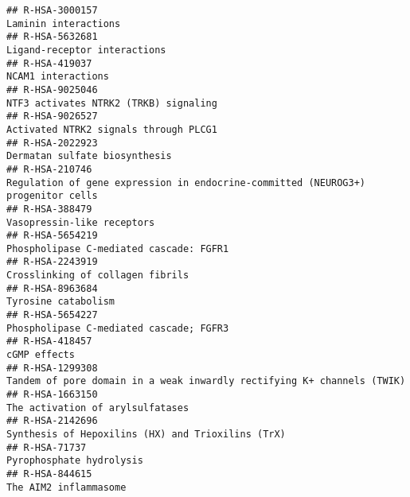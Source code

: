 \documentclass[
]{article}
\begin{document}
\begin{verbatim}
## R-HSA-3000157                                                                                                                 Laminin interactions
## R-HSA-5632681                                                                                                         Ligand-receptor interactions
## R-HSA-419037                                                                                                                    NCAM1 interactions
## R-HSA-9025046                                                                                                NTF3 activates NTRK2 (TRKB) signaling
## R-HSA-9026527                                                                                                Activated NTRK2 signals through PLCG1
## R-HSA-2022923                                                                                                        Dermatan sulfate biosynthesis
## R-HSA-210746                                                      Regulation of gene expression in endocrine-committed (NEUROG3+) progenitor cells
## R-HSA-388479                                                                                                            Vasopressin-like receptors
## R-HSA-5654219                                                                                              Phospholipase C-mediated cascade: FGFR1
## R-HSA-2243919                                                                                                     Crosslinking of collagen fibrils
## R-HSA-8963684                                                                                                                  Tyrosine catabolism
## R-HSA-5654227                                                                                              Phospholipase C-mediated cascade; FGFR3
## R-HSA-418457                                                                                                                          cGMP effects
## R-HSA-1299308                                                               Tandem of pore domain in a weak inwardly rectifying K+ channels (TWIK)
## R-HSA-1663150                                                                                                     The activation of arylsulfatases
## R-HSA-2142696                                                                                    Synthesis of Hepoxilins (HX) and Trioxilins (TrX)
## R-HSA-71737                                                                                                               Pyrophosphate hydrolysis
## R-HSA-844615                                                                                                                 The AIM2 inflammasome

\end{verbatim}
\end{document}
